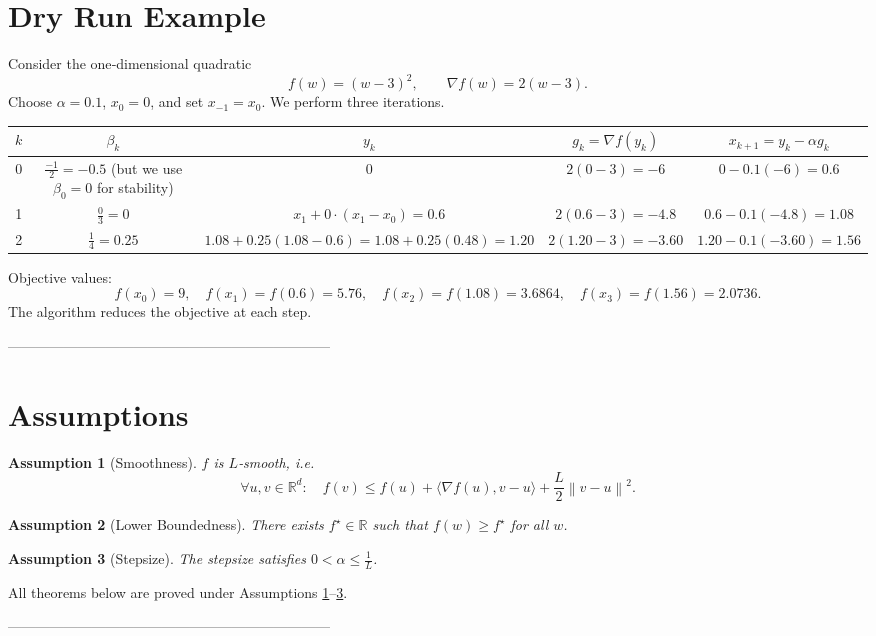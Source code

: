 \documentclass{article}
\newtheorem{assumption}{Assumption}
\newcommand{\norm}[1]{\left\lVert#1\right\rVert}
\newcommand{\grad}{\nabla}
\begin{document}
\section*{Dry Run Example}
Consider the one‑dimensional quadratic
\[
f(w)=(w-3)^2,\qquad \grad f(w)=2(w-3).
\]
Choose $\alpha=0.1$, $x_0=0$, and set $x_{-1}=x_0$.
We perform three iterations.

\begin{center}
\begin{tabular}{c|c|c|c|c}
$k$ & $\beta_k$ & $y_k$ & $g_k=\grad f(y_k)$ & $x_{k+1}=y_k-\alpha g_k$\\ \hline
0 & $\displaystyle\frac{-1}{2}= -0.5$ (but we use $\beta_0=0$ for stability) & $0$ & $2(0-3)=-6$ & $0-0.1(-6)=0.6$ \\[4pt]
1 & $\displaystyle\frac{0}{3}=0$ & $x_1+0\cdot(x_1-x_0)=0.6$ & $2(0.6-3)=-4.8$ & $0.6-0.1(-4.8)=1.08$ \\[4pt]
2 & $\displaystyle\frac{1}{4}=0.25$ & $1.08+0.25(1.08-0.6)=1.08+0.25(0.48)=1.20$ &
$2(1.20-3)=-3.60$ & $1.20-0.1(-3.60)=1.56$
\end{tabular}
\end{center}
Objective values:
\[
f(x_0)=9,\quad f(x_1)=f(0.6)=5.76,\quad f(x_2)=f(1.08)=3.6864,\quad f(x_3)=f(1.56)=2.0736.
\]
The algorithm reduces the objective at each step.

---------------------------------------------------------------------

\section*{Assumptions}
\begin{assumption}[Smoothness]\label{ass:smooth}
$f$ is $L$‑smooth, i.e.
\[
\forall u,v\in\mathbb{R}^d:\quad
f(v)\le f(u)+\langle\grad f(u),v-u\rangle+\frac{L}{2}\norm{v-u}^2 .
\tag{A1}
\]
\end{assumption}
\begin{assumption}[Lower Boundedness]\label{ass:lb}
There exists $f^\star\in\mathbb{R}$ such that $f(w)\ge f^\star$ for all $w$.
\end{assumption}
\begin{assumption}[Stepsize]\label{ass:step}
The stepsize satisfies $0<\alpha\le \frac{1}{L}$.
\end{assumption}
All theorems below are proved under Assumptions \ref{ass:smooth}–\ref{ass:step}.

---------------------------------------------------------------------
\end{document}
